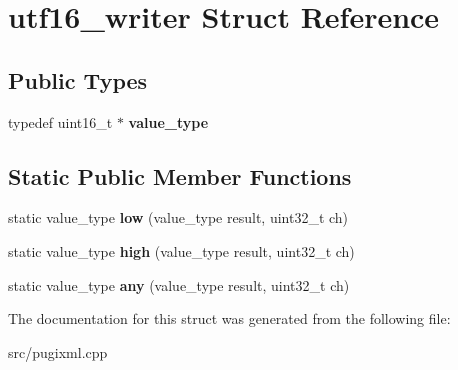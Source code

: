 \hypertarget{structutf16__writer}{}\section{utf16\+\_\+writer Struct Reference}
\label{structutf16__writer}
\subsection*{Public Types}
\begin{DoxyCompactItemize}
\item 
\mbox{\label{structutf16__writer_a527b705eaf5099167b8bc42423ce918c}} 
typedef uint16\+\_\+t $\ast$ {\bfseries value\+\_\+type}
\end{DoxyCompactItemize}
\subsection*{Static Public Member Functions}
\begin{DoxyCompactItemize}
\item 
\mbox{\label{structutf16__writer_ab11fef721a8b38de5e315d2e75d12956}} 
static value\+\_\+type {\bfseries low} (value\+\_\+type result, uint32\+\_\+t ch)
\item 
\mbox{\label{structutf16__writer_a01b6ce1a567dea11daead3ca83f42d5c}} 
static value\+\_\+type {\bfseries high} (value\+\_\+type result, uint32\+\_\+t ch)
\item 
\mbox{\label{structutf16__writer_ac14e06db126fbbef4be7efdb80fbdf4a}} 
static value\+\_\+type {\bfseries any} (value\+\_\+type result, uint32\+\_\+t ch)
\end{DoxyCompactItemize}


The documentation for this struct was generated from the following file\+:\begin{DoxyCompactItemize}
\item 
src/pugixml.\+cpp\end{DoxyCompactItemize}

